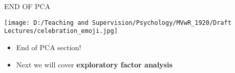 \documentclass[
  ignorenonframetext,
]{beamer}
\providecommand{\tightlist}{%
  \setlength{\itemsep}{0pt}\setlength{\parskip}{0pt}}
\begin{document}
\begin{frame}{END OF PCA}
\protect\hypertarget{end-of-pca}{}

\texttt{[image: D:/Teaching and Supervision/Psychology/MVwR\_1920/Draft Lectures/celebration\_emoji.jpg]}

\begin{itemize}
\tightlist
\item
  End of PCA section!
\item
  Next we will cover \textbf{exploratory factor analysis}
\end{itemize}

\end{frame}
\end{document}
